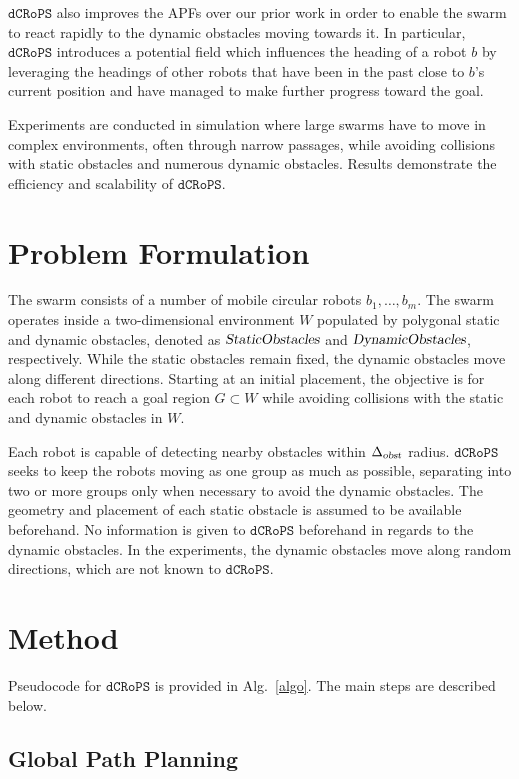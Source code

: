 \documentclass[letterpaper, 10pt, conference]{ieeeconf}
\newcommand{\Acronym}[1]{\ensuremath{{{\texttt{#1}}}}}
\newcommand{\Var}[1]{\ensuremath{{{\textsl{#1}}}}}
\newcommand{\Name}{\Acronym{dCRoPS}}
\begin{document}
$\Name$ also improves the APFs over our prior work
\cite{PlakuTAROS13boids} in order to enable the swarm to react rapidly
to the dynamic obstacles moving towards it.  In particular, $\Name$
introduces a potential field which influences the heading of a robot
$b$ by leveraging the headings of other robots that have been in the
past close to $b$'s current position and have managed to make further
progress toward the goal.


Experiments are conducted in
simulation where large swarms have to move in complex environments,
often through narrow passages, while avoiding collisions with static
obstacles and numerous dynamic obstacles. Results demonstrate the
efficiency and scalability of $\Name$.

\section{Problem Formulation}
\label{sec:Problem}
The swarm consists of a number of mobile circular robots
$b_1, \ldots, b_m$. The swarm operates inside a
two-dimensional environment $W$ populated by polygonal static and
dynamic obstacles, denoted as $\Var{StaticObstacles}$ and
$\Var{DynamicObstacles}$, respectively.  While the static obstacles
remain fixed, the dynamic obstacles move along different directions.
Starting at an initial placement, the objective is for each robot to
reach a goal region $G \subset W$ while avoiding collisions with the
static and dynamic obstacles in $W$.


Each robot is capable of detecting nearby obstacles within
$\Delta_\Var{obst}$ radius. $\Name$ seeks to keep the robots moving as
one group as much as possible, separating into two or more groups only
when necessary to avoid the dynamic obstacles.  The geometry and
placement of each static obstacle is assumed to be available
beforehand. No information is given to $\Name$ beforehand in regards
to the dynamic obstacles.  In the experiments, the dynamic obstacles
move along random directions, which are not known to $\Name$.


\section{Method}
\label{sec:Method}

Pseudocode for $\Name$ is provided in Alg.~\ref{algo}. The
main steps are described below.


\subsection{Global Path Planning}
\end{document}

